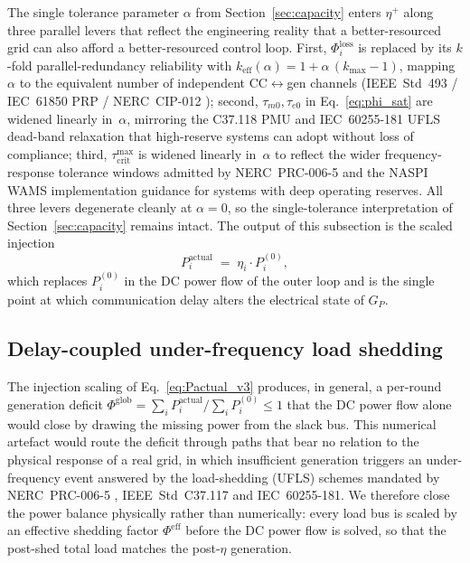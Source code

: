 The single tolerance parameter $\alpha$ from
Section~\ref{sec:capacity} enters $\eta^{+}$ along three
parallel levers that reflect the engineering reality that a
better-resourced grid can also afford a better-resourced
control loop.  First, $\Phi^{\text{loss}}_i$ is replaced by its
$k$-fold parallel-redundancy reliability with
$k_{\text{eff}}(\alpha)=1+\alpha\,(k_{\max}-1)$, mapping
$\alpha$ to the equivalent number of independent CC$\leftrightarrow$gen
channels (IEEE~Std~493 / IEC~61850 PRP / NERC~CIP-012
\citep{NERC_CIP012,IEC_61850_PRP}); second, $\tau_{m0},\tau_{e0}$
in Eq.~\eqref{eq:phi_sat} are widened linearly in~$\alpha$, mirroring
the C37.118 PMU and IEC~60255-181 UFLS dead-band relaxation that
high-reserve systems can adopt without loss of compliance; third,
$\tau_{\text{crit}}^{\max}$ is widened linearly in~$\alpha$ to
reflect the wider frequency-response tolerance windows admitted by
NERC~PRC-006-5 \citep{NERC_PRC006} and the NASPI WAMS
implementation guidance \citep{NASPI_LatencyGuidelines} for systems
with deep operating reserves.  All three levers degenerate cleanly
at $\alpha=0$, so the single-tolerance interpretation of
Section~\ref{sec:capacity} remains intact.  The output of this
subsection is the scaled injection
\begin{equation}\label{eq:Pactual_v3}
  P_i^{\text{actual}} \;=\; \eta_i \cdot P_i^{(0)},
\end{equation}
which replaces $P_i^{(0)}$ in the DC power flow of the outer
loop and is the single point at which communication delay alters
the electrical state of $G_P$.

\subsection{Delay-coupled under-frequency load shedding}\label{sec:ufls}

The injection scaling of Eq.~\eqref{eq:Pactual_v3} produces, in
general, a per-round generation deficit
$\Phi^{\text{glob}}=\sum_i P_i^{\text{actual}}/\sum_i P_i^{(0)}\le 1$
that the DC power flow alone would close by drawing the missing
power from the slack bus.  This numerical artefact would route the
deficit through paths that bear no relation to the physical response
of a real grid, in which insufficient generation triggers an
under-frequency event answered by the load-shedding (UFLS) schemes
mandated by NERC~PRC-006-5 \citep{NERC_PRC006},
IEEE~Std~C37.117 and IEC~60255-181.  We therefore close the
power balance physically rather than numerically: every load bus is
scaled by an effective shedding factor $\Phi^{\text{eff}}$ before
the DC power flow is solved, so that the post-shed total load
matches the post-$\eta$ generation.

